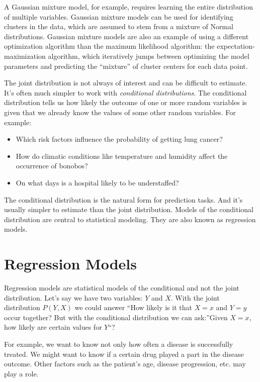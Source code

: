 \documentclass[
  10pt,
]{scrbook}
\providecommand{\tightlist}{%
  \setlength{\itemsep}{0pt}\setlength{\parskip}{0pt}}
\begin{document}
A Gaussian mixture model, for example, requires learning the entire distribution of multiple variables.
Gaussian mixture models can be used for identifying clusters in the data, which are assumed to stem from a mixture of Normal distributions.
Gaussian mixture models are also an example of using a different optimization algorithm than the maximum likelihood algorithm: the expectation-maximization algorithm, which iteratively jumps between optimizing the model parameters and predicting the ``mixture'' of cluster centers for each data point.

The joint distribution is not always of interest and can be difficult to estimate.
It's often much simpler to work with \emph{conditional distributions}.
The conditional distribution tells us how likely the outcome of one or more random variables is given that we already know the values of some other random variables.
For example:

\begin{itemize}
\tightlist
\item
  Which risk factors influence the probability of getting lung cancer?
\item
  How do climatic conditions like temperature and humidity affect the occurrence of bonobos?
\item
  On what days is a hospital likely to be understaffed?
\end{itemize}

The conditional distribution is the natural form for prediction tasks.
And it's usually simpler to estimate than the joint distribution.
Models of the conditional distribution are central to statistical modeling.
They are also known as regression models.

\hypertarget{regression-models}{%
\section{Regression Models}\label{regression-models}}

Regression models are statistical models of the conditional and not the joint distribution.
Let's say we have two variables: \(Y\) and \(X\).
With the joint distribution \(P(Y,X)\) we could answer ``How likely is it that \(X=x\) and \(Y=y\) occur together?
But with the conditional distribution we can ask:''Given \(X=x\), how likely are certain values for \(Y\)``?

For example, we want to know not only how often a disease is successfully treated.
We might want to know if a certain drug played a part in the disease outcome.
Other factors such as the patient's age, disease progression, etc. may play a role.
\end{document}
